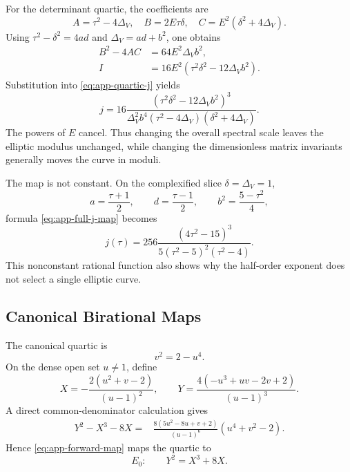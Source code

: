 \documentclass[11pt,reqno]{amsart}
\theoremstyle{remark}
\begin{document}
For the determinant quartic, the coefficients are
\begin{equation}\label{eq:app-quartic-ABC}
 A=\tau^2-4\Delta_V,
 \quad B=2E\tau\delta,
 \quad C=E^2(\delta^2+4\Delta_V).
\end{equation}
Using $\tau^2-\delta^2=4ad$ and $\Delta_V=ad+b^2$, one obtains
\begin{align}
 B^2-4AC&=64E^2\Delta_Vb^2,
 \label{eq:app-quartic-D-factor}\\
 I&=16E^2(\tau^2\delta^2-12\Delta_Vb^2).
 \label{eq:app-quartic-I-factor}
\end{align}
Substitution into \eqref{eq:app-quartic-j} yields
\begin{equation}\label{eq:app-full-j-map}
 j=16
 \frac{(\tau^2\delta^2-12\Delta_Vb^2)^3}
 {\Delta_V^2b^4
  (\tau^2-4\Delta_V)(\delta^2+4\Delta_V)}.
\end{equation}
The powers of $E$ cancel.  Thus changing the overall spectral scale leaves
the elliptic modulus unchanged, while changing the dimensionless matrix
invariants generally moves the curve in moduli.

The map is not constant.  On the complexified slice
$\delta=\Delta_V=1$,
\begin{equation}\label{eq:app-j-slice-realization}
 a=\frac{\tau+1}{2},
 \qquad
 d=\frac{\tau-1}{2},
 \qquad
 b^2=\frac{5-\tau^2}{4},
\end{equation}
formula \eqref{eq:app-full-j-map} becomes
\begin{equation}\label{eq:app-j-slice}
 j(\tau)=256\frac{(4\tau^2-15)^3}
 {5(\tau^2-5)^2(\tau^2-4)}.
\end{equation}
This nonconstant rational function also shows why the half-order exponent
does not select a single elliptic curve.

\subsection{Canonical Birational Maps}

The canonical quartic is
\begin{equation}\label{eq:app-canonical-quartic}
 v^2=2-u^4.
\end{equation}
On the dense open set $u\ne1$, define
\begin{equation}\label{eq:app-forward-map}
 X=-\frac{2(u^2+v-2)}{(u-1)^2},
 \qquad
 Y=\frac{4(-u^3+uv-2v+2)}{(u-1)^3}.
\end{equation}
A direct common-denominator calculation gives
\begin{align}
 Y^2-X^3-8X
 ={}&\frac{8(5u^2-8u+v+2)}{(u-1)^6}
 (u^4+v^2-2).
 \label{eq:app-forward-verification}
\end{align}
Hence \eqref{eq:app-forward-map} maps the quartic to
\begin{equation}\label{eq:app-E0-repeat}
 E_0:\qquad Y^2=X^3+8X.
\end{equation}
\end{document}
